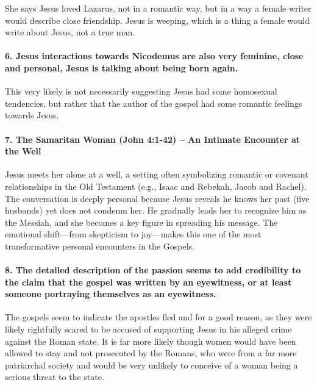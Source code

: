 She says Jesus loved Lazarus, not in a romantic way, but in a way a female writer would describe close friendship.
Jesus is weeping, which is a thing a female would write about Jesus, not a true man.

\paragraph{6.
Jesus interactions towards Nicodemus are also very feminine, close and personal, Jesus is talking about being born again.}\label{par:jesus-interactions-towards-nicodemus-are-also-very-feminine-close-and-personal-jesus-is-talking-about-being-born-again.}

This very likely is not necessarily suggesting Jesus had some homosexual tendencies, but rather that the author of the gospel had some romantic feelings towards Jesus.

\paragraph{7.
The Samaritan Woman (John 4:1-42) -- An Intimate Encounter at the Well}\label{par:the-samaritan-woman-john-41-42-an-intimate-encounter-at-the-well}

Jesus meets her alone at a well, a setting often symbolizing romantic or covenant relationships in the Old Testament (e.g., Isaac and Rebekah, Jacob and Rachel).
The conversation is deeply personal because Jesus reveals he knows her past (five husbands) yet does not condemn her.
He gradually leads her to recognize him as the Messiah, and she becomes a key figure in spreading his message.
The emotional shift---from skepticism to joy---makes this one of the most transformative personal encounters in the Gospels.

\paragraph{8.
The detailed description of the passion seems to add credibility to the claim that the gospel was written by an eyewitness, or at least someone portraying themselves as an eyewitness.}\label{par:the-detailed-description-of-the-passion-seems-to-add-credibility-to-the-claim-that-the-gospel-was-written-by-an-eyewitness-or-at-least-someone-portraying-themselves-as-an-eyewitness.}

The gospels seem to indicate the apostles fled and for a good reason, as they were likely rightfully scared to be accused of supporting Jesus in his alleged crime against the Roman state.
It is far more likely though women would have been allowed to stay and not prosecuted by the Romans, who were from a far more patriarchal society and would be very unlikely to conceive of a woman being a serious threat to the state.

